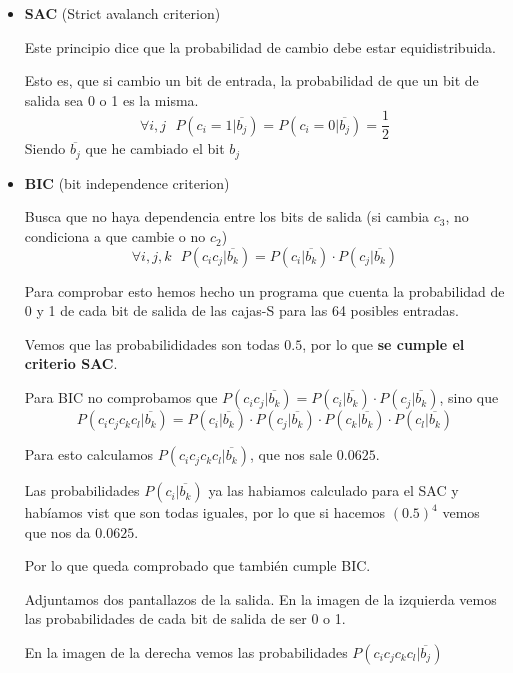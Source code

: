 \documentclass{apuntes}
\begin{document}
\begin{itemize}
	
	\item \textbf{SAC} (Strict avalanch criterion)
	
	Este principio dice que la probabilidad de cambio debe estar equidistribuida.
	
	Esto es, que si cambio un bit de entrada, la probabilidad de que un bit de salida sea 0 o 1 es la misma.
	$$\forall i,j\text{  }P(c_i=1|\overline{b_j})= P(c_i=0|\overline{b_j}) = \frac{1}{2}$$
	Siendo $\overline{b_j}$ que he cambiado el bit $b_j$
	
	\item \textbf{BIC} (bit independence criterion)
	
	Busca que no haya dependencia entre los bits de salida (si cambia $c_3$, no condiciona a que cambie o no $c_2$) 
	$$\forall i,j,k \text{  } P(c_ic_j|\overline{b_k}) = P(c_i|\overline{b_k})\cdot P(c_j|\overline{b_k})$$
	
	Para comprobar esto hemos hecho un programa que cuenta la probabilidad de 0 y 1 de cada bit de salida de las cajas-S para las 64 posibles entradas.
	
	Vemos que las probabilididades son todas $0.5$, por lo que \textbf{se cumple el criterio SAC}.
	
	Para BIC no comprobamos que $ P(c_ic_j|\overline{b_k}) = P(c_i|\overline{b_k})\cdot P(c_j|\overline{b_k})$, sino que
	$$ P(c_ic_jc_kc_l|\overline{b_k}) = P(c_i|\overline{b_k})\cdot P(c_j|\overline{b_k})\cdot P(c_k|\overline{b_k})\cdot P(c_l|\overline{b_k})$$

	Para esto calculamos $P(c_ic_jc_kc_l|\overline{b_k})$, que nos sale $ 0.0625$.
	
	Las probabilidades $P(c_i|\overline{b_k})$ ya las habiamos calculado para el SAC y habíamos vist que son todas iguales, por lo que si hacemos $(0.5)^4$ vemos que nos da $0.0625$.
	
	Por lo que queda comprobado que también cumple BIC.
	
	Adjuntamos dos pantallazos de la salida. En la imagen de la izquierda vemos las probabilidades de cada bit de salida de ser 0 o 1.
	
	En la imagen de la derecha vemos las probabilidades $P(c_ic_jc_kc_l|\overline{b_j})$
	

\end{itemize}
\end{document}
